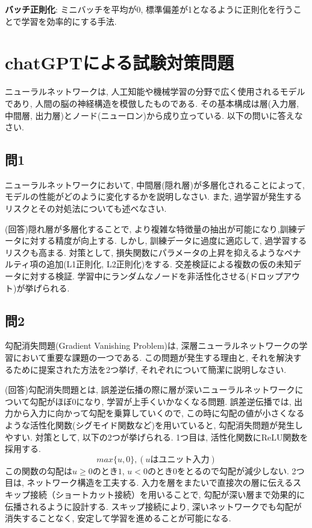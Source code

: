 \documentclass[dvipdfmx, 10pt]{jsarticle}
\begin{document}
\textbf{バッチ正則化}:
ミニバッチを平均が0, 標準偏差が1となるように正則化を行うことで学習を効率的にする手法. 

\section*{chatGPTによる試験対策問題}

ニューラルネットワークは, 人工知能や機械学習の分野で広く使用されるモデルであり, 人間の脳の神経構造を模倣したものである. その基本構成は層(入力層, 中間層, 出力層)とノード(ニューロン)から成り立っている. 以下の問いに答えなさい. 

\subsection*{問1}
ニューラルネットワークにおいて, 中間層(隠れ層)が多層化されることによって, モデルの性能がどのように変化するかを説明しなさい. また, 過学習が発生するリスクとその対処法についても述べなさい. 

(回答)隠れ層が多層化することで, より複雑な特徴量の抽出が可能になり,訓練データに対する精度が向上する. 
しかし, 訓練データに過度に適応して, 過学習するリスクも高まる. 
対策として, 損失関数にパラメータの上昇を抑えるようなペナルティ項の追加(L1正則化, L2正則化)をする. 
交差検証による複数の仮の未知データに対する検証. 学習中にランダムなノードを非活性化させる(ドロップアウト)が挙げられる. 

\subsection*{問2}
勾配消失問題(Gradient Vanishing Problem)は, 深層ニューラルネットワークの学習において重要な課題の一つである. この問題が発生する理由と, それを解決するために提案された方法を2つ挙げ, それぞれについて簡潔に説明しなさい. 

(回答)勾配消失問題とは, 誤差逆伝播の際に層が深いニューラルネットワークについて勾配がほぼ0になり, 学習が上手くいかなくなる問題. 
誤差逆伝播では, 出力から入力に向かって勾配を乗算していくので, この時に勾配の値が小さくなるような活性化関数(シグモイド関数など)を用いていると, 勾配消失問題が発生しやすい. 
対策として, 以下の2つが挙げられる. 
1つ目は, 活性化関数にReLU関数を採用する. 
$$max\{u, 0\}, (uはユニット入力)$$ 
この関数の勾配は$u\geq0$のとき$1$, $u<0$のとき$0$をとるので勾配が減少しない. 
2つ目は, ネットワーク構造を工夫する. 入力を層をまたいで直接次の層に伝えるスキップ接続（ショートカット接続）を用いることで, 勾配が深い層まで効果的に伝播されるように設計する. 
スキップ接続により, 深いネットワークでも勾配が消失することなく, 安定して学習を進めることが可能になる. 
\end{document}

